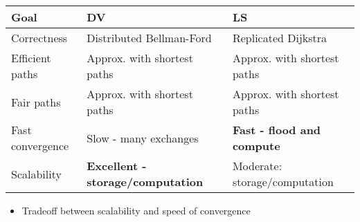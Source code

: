 \begin{itemize}
\begin{tabular}{| l | l | l |}
    Goal & DV & LS\\\hline
    Correctness & Distributed Bellman-Ford & Replicated Dijkstra\\
    Efficient paths & Approx. with shortest paths & Approx. with shortest paths\\
    Fair paths & Approx. with shortest paths & Approx. with shortest paths\\
    Fast convergence & Slow - many exchanges & \textbf{Fast - flood and compute}\\
    Scalability & \textbf{Excellent - storage/computation} & Moderate: storage/computation
\end{tabular}
        \begin{itemize}
            \item Tradeoff between scalability and speed of convergence\\
        \end{itemize}
\end{itemize}

